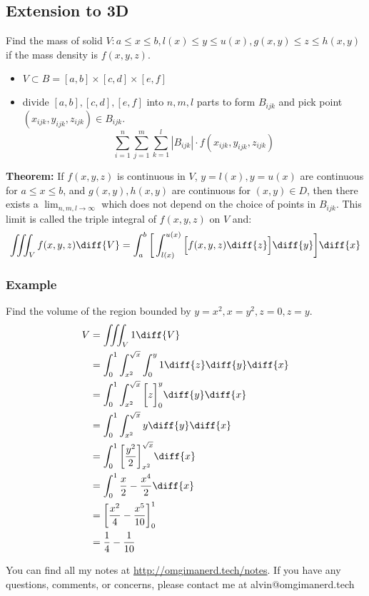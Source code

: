 \documentclass{math}
\begin{document}
\subsection*{Extension to 3D}
Find the mass of solid \( V:a\le x\le b, l(x)\le y\le u(x), g(x,y)\le z\le
h(x,y) \) if the mass density is \( f(x,y,z) \).
\begin{itemize}
  \item \( V\subset B = [a,b]\times[c,d]\times[e,f] \)
  \item divide \( [a,b],[c,d],[e,f] \) into \( n,m,l \) parts to form
  \( B_{ijk} \) and pick point \( (x_{ijk},y_{ijk},z_{ijk})\in B_{ijk} \).
  \[ \sum_{i=1}^{n}\sum_{j=1}^{m}\sum_{k=1}^{l}|B_{ijk}|\cdot
    f(x_{ijk},y_{ijk},z_{ijk}) \]
\end{itemize}
\textbf{Theorem:} If \( f(x,y,z) \) is continuous in \( V \), \( y = l(x),
y = u(x) \) are continuous for \( a\le x\le b \), and \( g(x,y),h(x,y) \) are
continuous for \( (x,y)\in D \), then there exists a \( \lim_{n,m,l\to\infty} \)
which does not depend on the choice of points in \( B_{ijk} \). This limit is
called the triple integral of \( f(x,y,z) \) on \( V \) and:
\[ \iiint_{V}f(x,y,z)\diff{V} = \int_{a}^{b}\bigg[\int_{l(x)}^{u(x)}\Big[
  f(x,y,z)\diff{z}\Big]\diff{y}\bigg]\diff{x} \]

\subsubsection*{Example}
Find the volume of the region bounded by \( y = x^2, x = y^2, z = 0, z = y \).
\begin{align*}
  V &= \iiint_{V}1\diff{V} \\
  &= \int_{0}^{1}\int_{x^2}^{\sqrt{x}}\int_{0}^{y}1\diff{z}\diff{y}\diff{x} \\
  &= \int_{0}^{1}\int_{x^2}^{\sqrt{x}}\bigg[z\bigg]_{0}^{y}\diff{y}\diff{x} \\
  &= \int_{0}^{1}\int_{x^2}^{\sqrt{x}}y\diff{y}\diff{x} \\
  &= \int_{0}^{1}\bigg[\frac{y^2}{2}\bigg]_{x^2}^{\sqrt{x}}\diff{x} \\
  &= \int_{0}^{1}\frac{x}{2}-\frac{x^4}{2}\diff{x} \\
  &= \bigg[\frac{x^2}{4}-\frac{x^5}{10}\bigg]_{0}^{1} \\
  &= \frac{1}{4}-\frac{1}{10} \\
\end{align*}

\begin{center}
  You can find all my notes at \url{http://omgimanerd.tech/notes}. If you have
  any questions, comments, or concerns, please contact me at
  alvin@omgimanerd.tech
\end{center}
\end{document}
